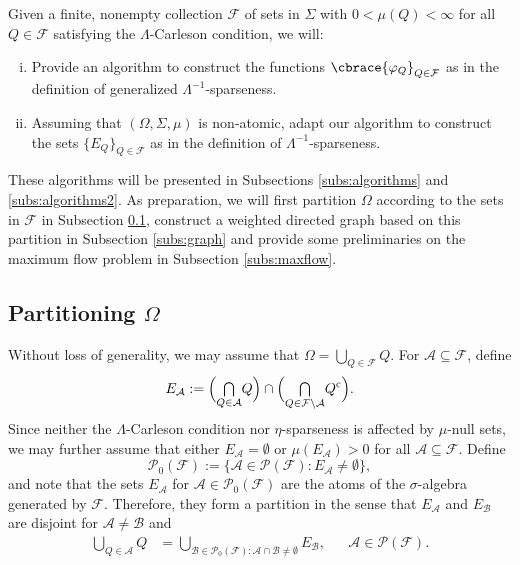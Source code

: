 \documentclass[a4paper, oneside,11pt]{amsart}
\theoremstyle{definition}
\theoremstyle{remark}
\numberwithin{equation}{section}
\newcommand{\mc}{\mathcal}
\DeclarePairedDelimiter\cbrace\{\}
\newcommand{\cbraceb}[1]{\bigl\{#1\bigr\}}
\newcommand{\bcup}[1]{{\textstyle\bigcup\limits_{#1}}}
\newcommand{\bcap}[1]{{\textstyle\bigcap\limits_{#1}}}
\newcommand{\has}[1]{\Bigl(#1\Bigr)}
\begin{document}
\bigskip

Given a finite, nonempty collection $\mc{F}$ of sets in $\Sigma$ with $0<\mu(Q)<\infty$ for all $Q \in \mc{F}$ satisfying the $\Lambda$-Carleson condition, we will:
\begin{enumerate}[(i)]
  \item Provide an algorithm to construct the functions $\cbrace{\varphi_Q}_{Q \in \mc{F}}$  as in the definition of generalized $\Lambda^{-1}$-sparseness.
  \item Assuming that $(\Omega,\Sigma,\mu)$ is non-atomic, adapt our algorithm to construct the sets $\{E_Q\}_{Q\in\mathcal{F}}$ as in the definition of $\Lambda^{-1}$-sparseness.
\end{enumerate}
These algorithms will be presented in Subsections  \ref{subs:algorithms} and \ref{subs:algorithms2}. As preparation, we will first partition $\Omega$ according to the sets in $\mc{F}$ in Subsection \ref{subs:partition}, construct a weighted directed graph based on this partition in Subsection \ref{subs:graph} and provide some preliminaries on the maximum flow problem in Subsection \ref{subs:maxflow}.

\subsection{Partitioning \texorpdfstring{$\Omega$}{O}}
\label{subs:partition}
Without loss of generality, we may assume that $\Omega = \bigcup_{Q \in \mc{F}}Q$. For $\mc{A} \subseteq \mc{F}$, define
$$
E_{\mc{A}}:= \has{\bcap{Q \in \mc{A}}Q}\cap \has{\bcap{Q \in \mc{F}\setminus \mc{A}}Q^{\mathrm{c}}}.
$$
Since neither the $\Lambda$-Carleson condition nor $\eta$-sparseness is affected by  $\mu$-null sets, we may further assume that either $E_{\mc{A}}=\emptyset$ or $\mu(E_{\mc{A}})>0$ for all $\mc{A} \subseteq \mc{F}$. Define $$\mc{P}_0(\mc{F}):= \cbraceb{\mc{A} \in \mc{P}(\mc{F}):E_{\mc{A}} \neq \emptyset},$$ and note that the sets $E_{\mc{A}}$ for $\mc{A} \in \mc{P}_0(\mc{F})$ are the atoms of the $\sigma$-algebra generated by $\mc{F}$. Therefore, they form a partition in the sense that $E_{\mc{A}}$ and $E_{\mc{B}}$ are disjoint for $\mc{A} \neq \mc{B}$ and
\begin{align}\label{eq:partition}
  \bcup{Q \in \mc{A}} Q &= \bigcup_{\mc{B} \in \mc{P}_0({\mc{F}}):\mc{A}\cap \mc{B}\neq \emptyset} E_{\mc{B}}, && \mc{A} \in \mc{P}(\mc{F}).
\end{align}
\end{document}
